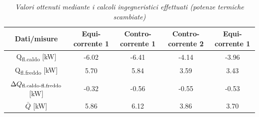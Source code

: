 \documentclass[a4paper,10pt]{article}                                                                                       %
\begin{document}
\vspace{3mm}                                                                                                                %
\begin{table}[H]                                                                                                            %
  \centering                                                                                                                %
  \begin{tabular}{||c|c|c|c|c||}                                                                                            %
    \hline
    Dati/misure                                         & Equi-corrente 1 & Contro-corrente 1 & Contro-corrente 2 & Equi-corrente 1 \\
    \hline\hline
    Q\textsubscript{fl.caldo} [kW]                      & -6.02           & -6.41             & -4.14             & -3.96           \\
    Q\textsubscript{fl.freddo} [kW]                     & 5.70            & 5.84              & 3.59              & 3.43            \\
    $\Delta{Q\textsubscript{fl.caldo-fl.freddo}}$ [kW]  & -0.32           & -0.56             & -0.55             & -0.53           \\
    $\bar{Q}$ [kW]                                      & 5.86            & 6.12              & 3.86              & 3.70            \\
    \hline
  \end{tabular}                                                                                                             %
  \caption{\textit{Valori ottenuti mediante i calcoli ingegneristici effettuati (potenze termiche scambiate)}}              %
  \label{tab:heat_tr_calcs}                                                                                                 %
\end{table}                                                                                                                 %
\vspace{3mm}                                                                                                                %
\end{document}
